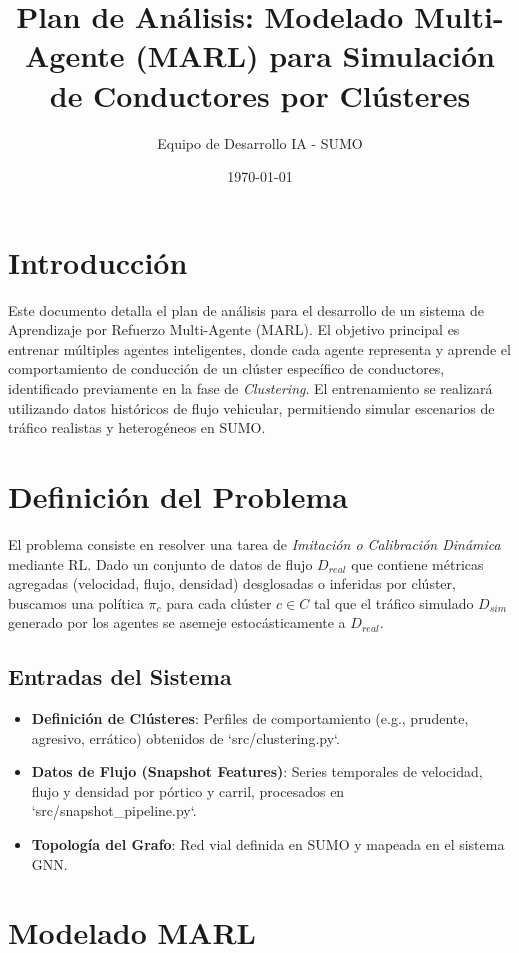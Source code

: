 \documentclass{article}
\title{Plan de Análisis: Modelado Multi-Agente (MARL) para Simulación de Conductores por Clústeres}
\author{Equipo de Desarrollo IA - SUMO}
\date{\today}
\begin{document}
\maketitle

\section{Introducción}
Este documento detalla el plan de análisis para el desarrollo de un sistema de Aprendizaje por Refuerzo Multi-Agente (MARL). El objetivo principal es entrenar múltiples agentes inteligentes, donde cada agente representa y aprende el comportamiento de conducción de un clúster específico de conductores, identificado previamente en la fase de \textit{Clustering}. El entrenamiento se realizará utilizando datos históricos de flujo vehicular, permitiendo simular escenarios de tráfico realistas y heterogéneos en SUMO.

\section{Definición del Problema}

El problema consiste en resolver una tarea de \textit{Imitación o Calibración Dinámica} mediante RL. Dado un conjunto de datos de flujo $D_{real}$ que contiene métricas agregadas (velocidad, flujo, densidad) desglosadas o inferidas por clúster, buscamos una política $\pi_c$ para cada clúster $c \in C$ tal que el tráfico simulado $D_{sim}$ generado por los agentes se asemeje estocásticamente a $D_{real}$.

\subsection{Entradas del Sistema}
\begin{itemize}
    \item \textbf{Definición de Clústeres}: Perfiles de comportamiento (e.g., prudente, agresivo, errático) obtenidos de `src/clustering.py`.
    \item \textbf{Datos de Flujo (Snapshot Features)}: Series temporales de velocidad, flujo y densidad por pórtico y carril, procesados en `src/snapshot\_pipeline.py`.
    \item \textbf{Topología del Grafo}: Red vial definida en SUMO y mapeada en el sistema GNN.
\end{itemize}

\section{Modelado MARL}
\end{document}
